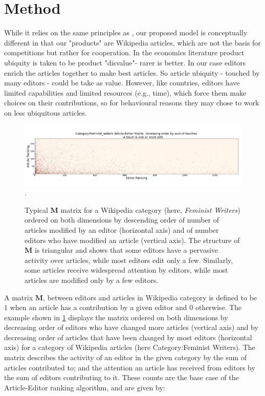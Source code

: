 \section{Method}
While it relies on the same principles as \cite{caldarelli2012network}, our proposed model is conceptually different in that our "products" are Wikipedia articles, which are not the basis for competitions but rather for cooperation. In the economics literature product ubiquity is taken to be product "disvalue"- rarer is better. In our case editors enrich the articles together to make best articles. So article ubiquity - touched by many editors - could be take as value.  However, like countries, editors have limited capabilities and limited resources (e.g., time), which force them make choices on their contributions, so for behavioural reasons they may chose to work on less ubiquitous articles.

\begin{figure}[!t]
\centering
\includegraphics[width=2.0\columnwidth]{Figures/Category_Feminist_writerstriangle_matrix_corrected.png}.
\caption{Typical $\mathbf{M}$ matrix for a Wikipedia category (here, {\it Feminist Writers}) ordered on both dimensions by descending order of number of articles modified by an editor (horizontal axis) and of number editors who have modified an article (vertical axis). The structure of $\mathbf{M}$ is triangular and shows that some editors have a pervasive activity over articles, while most editors edit only a few. Similarly, some articles receive widespread attention by editors, while most articles are modified only by a few editors.}
\label{fig:triangle}
\end{figure}


A matrix $\mathbf{M}$, between editors and articles in Wikipedia category is defined to be $1$ when an article has a contribution by a given editor and $0$ otherwise. The example shown in \ref{fig:triangle} displays the matrix ordered on both dimensions by decreasing order of editors who have changed more articles (vertical axis) and by decreasing order of articles that have been changed by most editors (horizontal axis) for a category of Wikipedia articles (here Category:Feminist Writers). The matrix describes the activity of an editor in the given category by the sum of articles contributed to; and the attention an article has received from editors by the sum of editors contributing to it. 
These counts are the base case of the Article-Editor ranking algorithm, and are given by:

